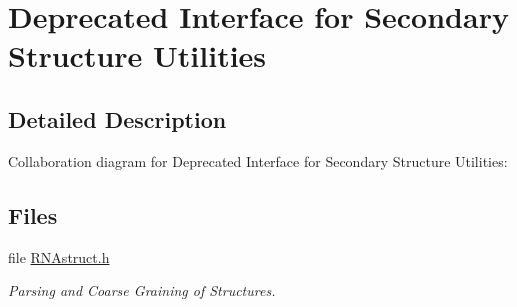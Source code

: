 \hypertarget{group__struct__utils__deprecated}{}\section{Deprecated Interface for Secondary Structure Utilities}
\label{group__struct__utils__deprecated}


\subsection{Detailed Description}
Collaboration diagram for Deprecated Interface for Secondary Structure Utilities\+:
\subsection*{Files}
\begin{DoxyCompactItemize}
\item 
file \mbox{\hyperlink{RNAstruct_8h}{R\+N\+Astruct.\+h}}
\begin{DoxyCompactList}\small\item\em Parsing and Coarse Graining of Structures. \end{DoxyCompactList}\end{DoxyCompactItemize}
